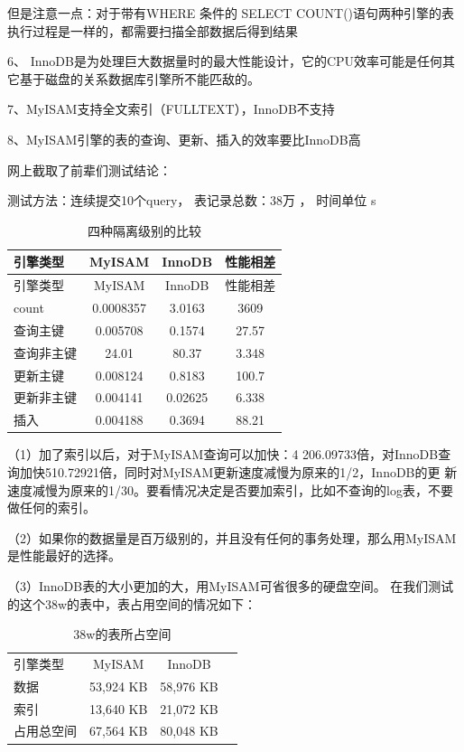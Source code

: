\documentclass[UTF8]{ctexart}
\begin{document}
但是注意一点：对于带有WHERE 条件的 SELECT COUNT()语句两种引擎的表执行过程是一样的，都需要扫描全部数据后得到结果

6、 InnoDB是为处理巨大数据量时的最大性能设计，它的CPU效率可能是任何其它基于磁盘的关系数据库引擎所不能匹敌的。

7、MyISAM支持全文索引（FULLTEXT），InnoDB不支持

8、MyISAM引擎的表的查询、更新、插入的效率要比InnoDB高

网上截取了前辈们测试结论： 

测试方法：连续提交10个query， 表记录总数：38万 ， 时间单位 s
\begin{table}[]
    \caption{四种隔离级别的比较}
    \vspace{20pt}
    \centering
    \begin{tabular}{|l||c|c|c|}
        \hline
        引擎类型 &MyISAM&InnoDB&性能相差\\
        \hline
        引擎类型             &      MyISAM           &     InnoDB      &        性能相差\\
        count               &      0.0008357     &       3.0163      &          3609\\
        查询主键             &   0.005708         &     0.1574        &        27.57\\
        查询非主键           &    24.01         &         80.37      &          3.348\\
        更新主键             &  0.008124         &      0.8183        &        100.7\\
        更新非主键           &   0.004141       &     0.02625        &      6.338\\
        插入                 &    0.004188      &      0.3694       &         88.21\\
        \hline       
    \end{tabular}
    \label{bs3}
\end{table}
（1）加了索引以后，对于MyISAM查询可以加快：4 206.09733倍，对InnoDB查询加快510.72921倍，同时对MyISAM更新速度减慢为原来的1/2，InnoDB的更
  新速度减慢为原来的1/30。要看情况决定是否要加索引，比如不查询的log表，不要做任何的索引。
 
 （2）如果你的数据量是百万级别的，并且没有任何的事务处理，那么用MyISAM是性能最好的选择。
 
 （3）InnoDB表的大小更加的大，用MyISAM可省很多的硬盘空间。
        在我们测试的这个38w的表中，表占用空间的情况如下：
   \begin{table}[]
    \caption{38w的表所占空间}
    \vspace{20pt}
    \centering
    \begin{tabular}{|l|c|c|c|}
        \hline
            引擎类型       &             MyISAM     &        InnoDB\\
            数据            &          53,924 KB      &    58,976 KB\\
            索引             &         13,640 KB     &     21,072 KB\\
            占用总空间      &        67,564 KB       &   80,048 KB\\
          \hline       
    \end{tabular}
    \label{bs4}
\end{table}
\end{document}
